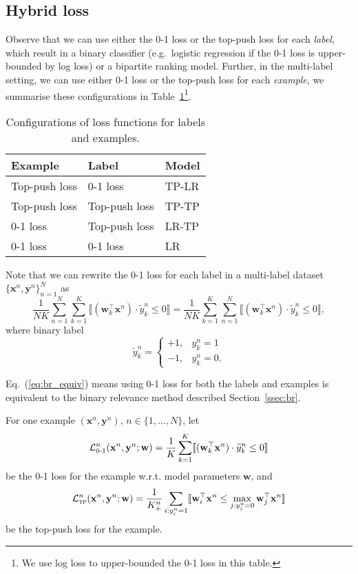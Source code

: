 \documentclass[9pt]{extarticle}
\newcommand{\llb}{\llbracket}
\newcommand{\rrb}{\rrbracket}
\newcommand{\x}{\mathbf{x}}
\newcommand{\y}{\mathbf{y}}
\newcommand{\1}{\mathbf{1}}
\newcommand{\w}{\mathbf{w}}
\newcommand{\LCal}{\mathcal{L}}
\newcommand{\eg}{e.g.\ }
\begin{document}
\subsection{Hybrid loss}
\label{ssec:hybrid}

Observe that we can use either the 0-1 loss or the top-push loss for each \emph{label}, 
which result in a binary classifier (\eg logistic regression if the 0-1 loss is upper-bounded by log loss) or a bipartite ranking model.
Further, in the multi-label setting, we can use either 0-1 loss or the top-push loss for each \emph{example}, 
we summarise these configurations in Table~\ref{tab:config}\footnote{We use log loss to upper-bounded the 0-1 loss in this table.}.

\begin{table}[!h]
\centering
\caption{Configurations of loss functions for labels and examples.}
\label{tab:config}
\begin{tabular}{lll}
\toprule
\textbf{Example} & \textbf{Label}  & \textbf{Model} \\ \hline
Top-push loss    & 0-1 loss        & TP-LR \\
Top-push loss    & Top-push loss   & TP-TP \\
0-1 loss         & Top-push loss   & LR-TP \\
0-1 loss         & 0-1 loss        & LR    \\
\bottomrule
\end{tabular}
\end{table}

Note that we can rewrite the 0-1 loss for each label in a multi-label dataset $\{\x^n, \y^n\}_{n=1}^N$ as
\begin{equation}
\label{eq:br_equiv}
\frac{1}{NK} \sum_{n=1}^N \sum_{k=1}^K \llb (\w_k^\top \x^n) \cdot \widetilde{y}_k^n \le 0 \rrb 
= \frac{1}{NK} \sum_{k=1}^K \sum_{n=1}^N \llb (\w_k^\top \x^n) \cdot \widetilde{y}_k^n \le 0 \rrb,
\end{equation}
where binary label 
$$
\widetilde{y}_k^n = \begin{cases}
+1, & y_k^n = 1 \\
-1, & y_k^n = 0.
\end{cases}
$$

Eq.~(\ref{eq:br_equiv}) means using 0-1 loss for both the labels and examples is equivalent to 
the binary relevance method described Section~\ref{ssec:br}.

For one example $(\x^n, \y^n), \, n \in \{1,\dots,N\}$, let
\begin{equation}
\label{eq:log_loss_example}
\LCal_\textsc{0-1}^n(\x^n, \y^n; \w) = \frac{1}{K} \sum_{k=1}^K \llb (\w_k^\top \x^n) \cdot \widetilde{y}_k^n \le 0 \rrb 
\end{equation}
be the 0-1 loss for the example w.r.t. model parameters $\w$, and
\begin{equation}
\label{eq:tp_loss_example}
\LCal_\textsc{tp}^n(\x^n, \y^n; \w) = \frac{1}{K_+^n} \sum_{i: y_i^n=1} \llb \w_i^\top \x^n \le \max_{j: y_j^n=0} \w_j^\top \x^n \rrb
\end{equation}
be the top-push loss for the example. 
\end{document}
